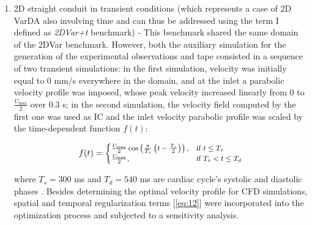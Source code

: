 \begin{enumerate}
    \item 2D straight conduit in transient conditions (which represents a case of 2D VarDA also involving time and can thus be addressed using the term I defined as \emph{2DVar+t} benchmark) - This benchmark shared the same domain of the 2DVar benchmark. However, both the auxiliary simulation for the generation of the experimental observations and tape consisted in a sequence of two transient simulations: in the first simulation, velocity was initially equal to 0 mm/s everywhere in the domain, and at the inlet a parabolic velocity profile was imposed, whose peak velocity increased linearly from 0 to \( \frac{ U_{\text{max}}}{2} \) over 0.3 s; in the second simulation, the velocity field computed by the first one was used as IC and the inlet velocity parabolic profile was scaled by the time-dependent function \( f(t) \):

\begin{equation}
\small
f(t) = 
\begin{cases}
\frac{U_{\text{max}}}{2}\cos\left(\frac{\pi}{T_s}\left(t - \frac{T_s}{2}\right)\right), & \text{if } t \leq T_s \\
\frac{U_{\text{max}}}{2}, & \text{if } T_s < t \leq T_d
\label{eq:13}
\end{cases}
\end{equation}

where \( T_s = 300 \) ms and \( T_d = 540 \) ms are cardiac cycle's systolic and diastolic phases \citep{Katz1977}. Besides determining the optimal velocity profile for CFD simulations, spatial and temporal regularization terms [\cref{eq:12}] were incorporated into the optimization process and subjected to a sensitivity analysis.\\


\end{enumerate}

